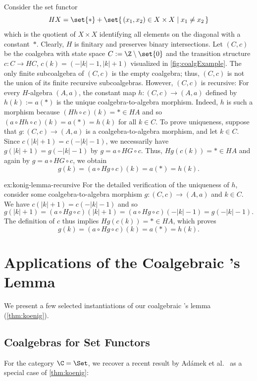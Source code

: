 \begin{example}\label{ex:konig-lemma-recursive}
  Consider the set functor
  \[
    HX = \set{*} + \set{\,(x_1,x_2)\in X\times X \mid x_1\neq x_2\,}
  \]
  which is the quotient of $X\times X$ identifying all elements on the diagonal with a constant~$*$. Clearly, $H$ is finitary and preserves binary intersections. Let $(C,c)$ be the coalgebra with state space $C := \Z\setminus\set{0}$ and the transition structure
  $c\colon C \to HC$, $c(k) = (-|k|-1, |k|+1)$ visualized in \autoref{fig:coalgExample}.
                                    The only finite subcoalgebra of $(C,c)$ is the empty coalgebra; thus, $(C,c)$ is not the union of its finite recursive subcoalgebras. However, $(C,c)$ is recursive: For every $H$-algebra $(A,a)$, the constant map $h\colon (C,c)\to (A,a)$ defined by $h(k) :=
  a(*)$ is the unique coalgebra-to-algebra morphism. Indeed, $h$ is such a morphism because $(Hh\circ  c)(k) = *\in HA$ and so $(a\circ Hh\circ c)(k)=a(*)=h(k)$ for all $k\in C$. To prove uniqueness, suppose that $g\colon (C,c)\to (A,a)$ is a coalgebra-to-algebra morphism, and let $k\in C$. Since $c(|k|+1) = c(-|k|-1)$,
  we necessarily have $g(|k|+1) = g(-|k|-1)$ by $g = a\circ HG\circ c$. Thus, $Hg(c(k)) = * \in HA$ and again by $g = a\circ HG\circ c$, we obtain
\[ g(k) = (a\circ Hg\circ c)(k) = a(*) = h(k).\]
\twnote[inline]{}
\end{example}
\begin{proofappendix}{ex:konig-lemma-recursive}
  For the detailed verification of the uniqueness of $h$, consider some coalgebra-to-algebra morphism $g\colon (C,c)\to (A,a)$ and $k\in C$.
  We have $c(|k|+1) = c(-|k|-1)$ and so
    \[
      g(|k|+1)
      = (a \circ Hg \circ c)(|k|+1)
      = (a \circ Hg\circ c)(-|k|-1)
      = g(-|k|-1).
    \]
    The definition of $c$ thus implies
    $Hg(c(k)) = * \in HA$, which proves
  \[ g(k) = (a\circ Hg\circ c)(k) = a(*) = h(k).
  \tag*{\qedhere\qed}
  \] 
\end{proofappendix}

\section{Applications of the Coalgebraic \Konig's Lemma}\label{sec:applications}
We present a few selected instantiations of our coalgebraic \Konig's lemma (\autoref{thm:koenig}).

\subsection{Coalgebras for Set Functors}\label{sec:finitary-set}
For the category $\C=\Set$, we recover a recent result by Ad\'amek et al.~\cite[Prop,~9.2.19]{amm25} as a special case of \autoref{thm:koenig}:

